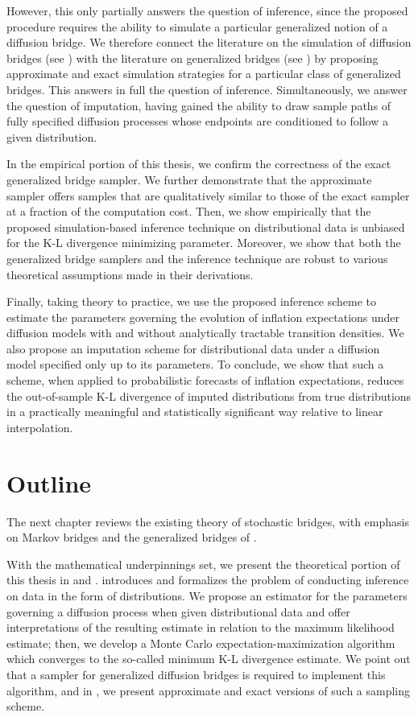 However, this only partially answers the question of inference, since
the proposed procedure requires the ability to simulate a particular
generalized notion of a diffusion bridge. We therefore connect the
literature on the simulation of diffusion bridges (see \citet{bladt-sorensen-2014})
with the literature on generalized bridges (see \citet{baudoin-2002})
by proposing approximate and exact simulation strategies for a particular
class of generalized bridges. This answers in full the question of
inference. Simultaneously, we answer the question of imputation, having
gained the ability to draw sample paths of fully specified diffusion
processes whose endpoints are conditioned to follow a given distribution.

In the empirical portion of this thesis, we confirm the correctness
of the exact generalized bridge sampler. We further demonstrate that
the approximate sampler offers samples that are qualitatively similar
to those of the exact sampler at a fraction of the computation cost.
Then, we show empirically that the proposed simulation-based inference
technique on distributional data is unbiased for the K-L divergence
minimizing parameter. Moreover, we show that both the generalized
bridge samplers and the inference technique are robust to various
theoretical assumptions made in their derivations.

Finally, taking theory to practice, we use the proposed inference
scheme to estimate the parameters governing the evolution of inflation
expectations under diffusion models with and without analytically
tractable transition densities. We also propose an imputation scheme
for distributional data under a diffusion model specified only up
to its parameters. To conclude, we show that such a scheme, when applied
to probabilistic forecasts of inflation expectations, reduces the
out-of-sample K-L divergence of imputed distributions from true distributions
in a practically meaningful and statistically significant way relative
to linear interpolation.


\section{Outline}

The next chapter reviews the existing theory of stochastic bridges,
with emphasis on Markov bridges and the generalized bridges of \citet{baudoin-2002}.

With the mathematical underpinnings set, we present the theoretical
portion of this thesis in  and . 
introduces and formalizes the problem of conducting inference on data
in the form of distributions. We propose an estimator for the parameters
governing a diffusion process when given distributional data and offer
interpretations of the resulting estimate in relation to the maximum
likelihood estimate; then, we develop a Monte Carlo expectation-maximization
algorithm which converges to the so-called minimum K-L divergence
estimate. We point out that a sampler for generalized diffusion bridges
is required to implement this algorithm, and in , we present
approximate and exact versions of such a sampling scheme.

